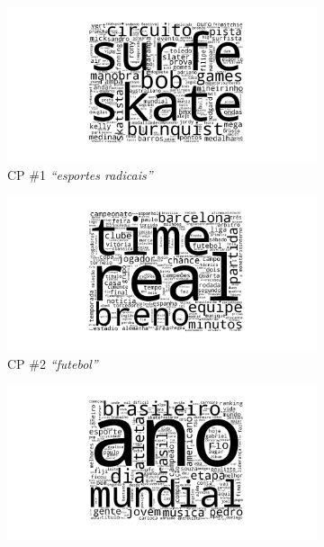 \documentclass[
    12pt,                %
    oneside,            %
    a4paper,            %
    english,            %
    brazil                %
    ]{abntex2ppgsi}
\begin{document}
\begin{figure}[H]
\centering
\caption{Visualização em nuvem de palavras das top-$100$ palavras, para cada cogrupo gerados pelo algoritmo \textit{ONMTF}}
    \begin{subfigure}[b]{0.45\textwidth}
        \includegraphics[width=\textwidth]{img/onmtf-tc-1.png}
        \caption{CP \#1 \textit{``esportes radicais''}}
    \end{subfigure}
    \begin{subfigure}[b]{0.45\textwidth}
        \includegraphics[width=\textwidth]{img/onmtf-tc-2.png}
        \caption{CP \#2 \textit{``futebol''}}
    \end{subfigure}
    \begin{subfigure}[b]{0.45\textwidth}
        \includegraphics[width=\textwidth]{img/onmtf-tc-3.png}

\end{subfigure}
\end{figure}
\end{document}
